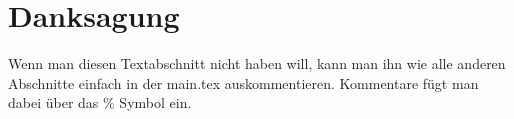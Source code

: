 \chapter*{Danksagung}
Wenn man diesen Textabschnitt nicht haben will, kann man ihn wie alle anderen Abschnitte einfach in der main.tex auskommentieren. Kommentare fügt man dabei über das \% Symbol ein.